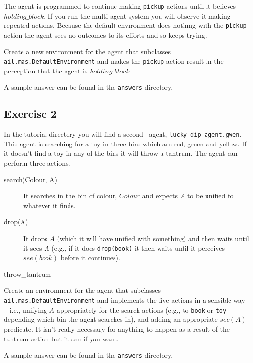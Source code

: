 The agent is programmed to continue making \texttt{pickup} actions  until it believes $holding\_block$.  If you run the multi-agent system you will observe it making repeated actions.  Because the default environment does nothing with the \texttt{pickup} action the agent sees no outcomes to its efforts and so keeps trying.

\begin{sloppypar}
Create a new environment for the agent that subclasses \texttt{ail.mas.DefaultEnvironment} and makes the \texttt{pickup} action result in the perception that the agent is $holding\_block$.
\end{sloppypar}

A sample answer can be found in the \texttt{answers} directory.

\subsection{Exercise 2}
\begin{sloppypar}
In the tutorial directory you will find a second \gwendolen\ agent, \texttt{lucky\_dip\_agent.gwen}.  This agent is searching for a toy in three bins which are red, green and yellow.  If it doesn't find a toy in any of the bins it will throw a tantrum.  The agent can perform three actions.
\end{sloppypar}

\begin{description}
\item[search(Colour, A)] It searches in the bin of colour, $Colour$ and expects $A$ to be unified to whatever it finds. 
\item[drop(A)] It drops $A$ (which it will have unified with something) and then waits until it sees $A$ (e.g., if it does \texttt{drop(book)} it then waits until it perceives $see(book)$ before it continues).
\item[throw\_tantrum]
\end{description}

\begin{sloppypar}
Create an environment for the agent that subclasses \texttt{ail.mas.DefaultEnvironment} and implements the five actions in a sensible way -- i.e., unifying $A$ appropriately for the search actions (e.g., to \texttt{book} or \texttt{toy} depending which bin the agent searches in), and adding an appropriate $see(A)$ predicate.  It isn't really necessary for anything to happen as a result of the tantrum action but it can if you want.
\end{sloppypar}

A sample answer can be found in the \texttt{answers} directory.

